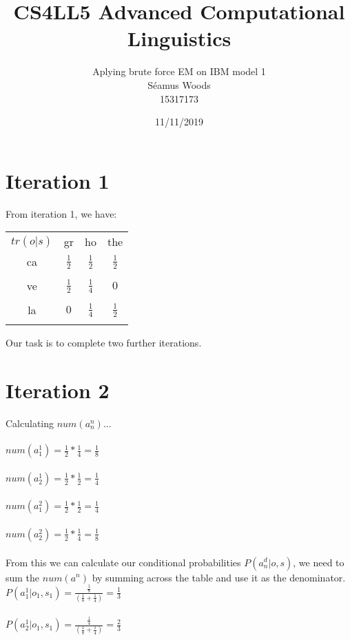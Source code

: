 \documentclass[12pt]{report}
\title{CS4LL5
 Advanced Computational Linguistics}
\author{Aplying brute force EM on IBM model 1 \\ Séamus Woods \\ 15317173}
\date{11/11/2019}
\begin{document}
\maketitle
\newpage

\section{Iteration 1}
From iteration 1, we have:
\newline
\begin{center}
\begin{tabular}{c c c c}
$tr(o|s)$ & gr & ho & the \\
ca & $\frac{1}{2}$ & $\frac{1}{2}$ & $\frac{1}{2}$ \\\\
ve & $\frac{1}{2}$ & $\frac{1}{4}$ & $0$ \\\\
la & $0$ & $\frac{1}{4}$ & $\frac{1}{2}$ \\\\
\end{tabular}
\end{center}
Our task is to complete two further iterations. 

\section{Iteration 2}
Calculating $num(a^n_n)$...\\\\
$num(a^1_1) = \frac{1}{2} * \frac{1}{4} = \frac{1}{8}$\\\\
$num(a^1_2) = \frac{1}{2} * \frac{1}{2} = \frac{1}{4}$\\\\
$num(a^2_1) = \frac{1}{2} * \frac{1}{2} = \frac{1}{4}$\\\\
$num(a^2_2) = \frac{1}{2} * \frac{1}{4} = \frac{1}{8}$\\\\
From this we can calculate our conditional probabilities $P(a^d_n|o,s)$, we need to sum the $num(a^n)$ by summing across the table and use it as the denominator.\\

$P(a^1_1|o_1,s_1) = \frac{\frac{1}{8}}{(\frac{1}{8} + \frac{1}{4})} = \frac{1}{3}$\\\\

$P(a^1_2|o_1,s_1) = \frac{\frac{1}{4}}{(\frac{1}{8} + \frac{1}{4})} = \frac{2}{3}$\\\\
\end{document}
